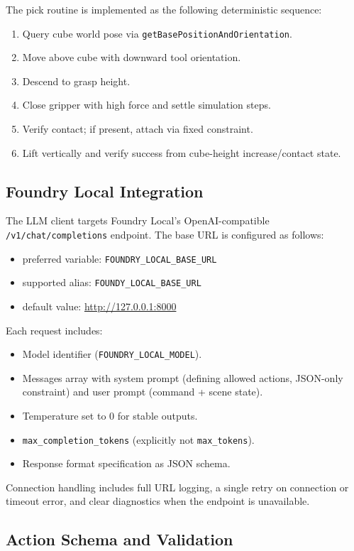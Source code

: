 \documentclass[12pt,a4paper]{article}
\begin{document}
The pick routine is implemented as the following deterministic sequence:
\begin{enumerate}
\item Query cube world pose via \texttt{getBasePositionAndOrientation}.
\item Move above cube with downward tool orientation.
\item Descend to grasp height.
\item Close gripper with high force and settle simulation steps.
\item Verify contact; if present, attach via fixed constraint.
\item Lift vertically and verify success from cube-height increase/contact state.
\end{enumerate}

\subsection{Foundry Local Integration}

The LLM client targets Foundry Local's OpenAI-compatible \texttt{/v1/chat/completions} endpoint. The base URL is configured as follows:
\begin{itemize}
\item preferred variable: \texttt{FOUNDRY\_LOCAL\_BASE\_URL}
\item supported alias: \texttt{FOUNDY\_LOCAL\_BASE\_URL}
\item default value: \url{http://127.0.0.1:8000}
\end{itemize}

Each request includes:
\begin{itemize}
\item Model identifier (\texttt{FOUNDRY\_LOCAL\_MODEL}).
\item Messages array with system prompt (defining allowed actions, JSON-only constraint) and user prompt (command + scene state).
\item Temperature set to 0 for stable outputs.
\item \texttt{max\_completion\_tokens} (explicitly not \texttt{max\_tokens}).
\item Response format specification as JSON schema.
\end{itemize}

Connection handling includes full URL logging, a single retry on connection or timeout error, and clear diagnostics when the endpoint is unavailable.

\subsection{Action Schema and Validation}
\end{document}
